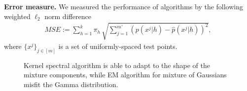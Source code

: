 \documentclass{article}
\begin{document}
{\bf Error measure.} We measured the performance of algorithms by the
following weighted $\ell_2$ norm difference
\begin{align*}
  MSE:=\sum_{h=1}^{k} \pi_h\, \sqrt{\sum_{j=1}^{m'} (p(x^j|h) - \widehat{p}(x^j|h))^2 },
\end{align*}
where $\{x^j\}_{j\in[m]}$ is a set of uniformly-spaced test points.
%
%
\begin{figure}[t]
  \caption{Kernel spectral algorithm is able to adapt to the shape of the mixture components, while EM algorithm for mixture of Gaussians misfit the Gamma distribution.}\label{fig:shape}
\end{figure}
\vspace{-1mm}
%
\end{document}
